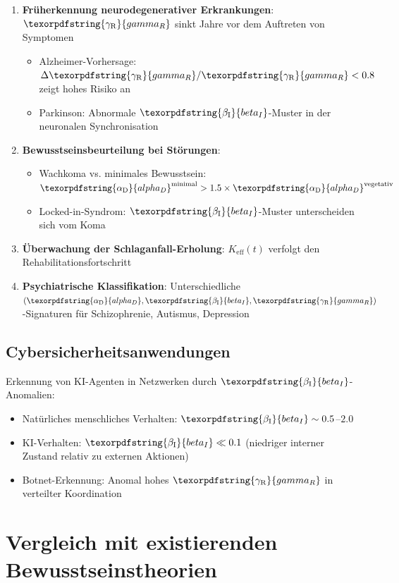 \documentclass[12pt,a4paper]{article}
\DeclareRobustCommand{\alD}{\texorpdfstring{\ensuremath{\alpha_{\mathrm{D}}}}{alpha_D}}
\DeclareRobustCommand{\beI}{\texorpdfstring{\ensuremath{\beta_{\mathrm{I}}}}{beta_I}}
\DeclareRobustCommand{\gaR}{\texorpdfstring{\ensuremath{\gamma_{\mathrm{R}}}}{gamma_R}}
\newcommand{\eff}{\mathrm{eff}}
\newcommand{\Ke}{K_{\eff}}
\begin{document}
	\begin{enumerate}
		\item \textbf{Früherkennung neurodegenerativer Erkrankungen}: \(\gaR\) sinkt Jahre vor dem Auftreten von Symptomen
		\begin{itemize}
			\item Alzheimer-Vorhersage: \(\Delta\gaR/\gaR < 0.8\) zeigt hohes Risiko an
			\item Parkinson: Abnormale \(\beI\)-Muster in der neuronalen Synchronisation
		\end{itemize}
		
		\item \textbf{Bewusstseinsbeurteilung bei Störungen}:
		\begin{itemize}
			\item Wachkoma vs. minimales Bewusstsein: \(\alD^{\mathrm{minimal}} > 1.5 \times \alD^{\mathrm{vegetativ}}\)
			\item Locked-in-Syndrom: \(\beI\)-Muster unterscheiden sich vom Koma
		\end{itemize}
		
		\item \textbf{Überwachung der Schlaganfall-Erholung}: \(\Ke(t)\) verfolgt den Rehabilitationsfortschritt
		\item \textbf{Psychiatrische Klassifikation}: Unterschiedliche \((\alD, \beI, \gaR)\)-Signaturen für Schizophrenie, Autismus, Depression
	\end{enumerate}
	
	\subsection{Cybersicherheitsanwendungen}
	
	Erkennung von KI-Agenten in Netzwerken durch \(\beI\)-Anomalien:
	\begin{itemize}
		\item Natürliches menschliches Verhalten: \(\beI \sim 0.5\)--\(2.0\)
		\item KI-Verhalten: \(\beI \ll 0.1\) (niedriger interner Zustand relativ zu externen Aktionen)
		\item Botnet-Erkennung: Anomal hohes \(\gaR\) in verteilter Koordination
	\end{itemize}
	
	\section{Vergleich mit existierenden Bewusstseinstheorien}
	
\end{document}
